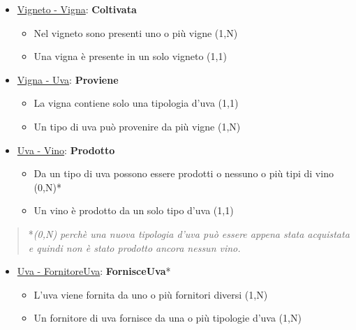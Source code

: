 \begin{itemize}
	\item \underline{Vigneto - Vigna}: \textbf{Coltivata}
	
	\begin{itemize}
		\item Nel vigneto sono presenti uno o più vigne (1,N)
		\item Una vigna è presente in un solo vigneto (1,1)
	\end{itemize}
	
\end{itemize}

\begin{itemize}
	\item \underline{Vigna - Uva}: \textbf{Proviene}
	
	\begin{itemize}
		\item La vigna contiene solo una tipologia d'uva (1,1)
		\item Un tipo di uva può provenire da più vigne (1,N)
	\end{itemize}
	
\end{itemize}

\begin{itemize}
	\item \underline{Uva - Vino}: \textbf{Prodotto}
	
	\begin{itemize}
		\item Da un tipo di uva possono essere prodotti o nessuno o più tipi di vino (0,N)*
		\item Un vino è prodotto da un solo tipo d'uva (1,1)
	\end{itemize}
	
\end{itemize}

\begin{verse}
	*\emph{(0,N) perchè una nuova tipologia d'uva può essere appena stata acquistata e quindi non è stato prodotto ancora nessun vino.}
\end{verse}


\begin{itemize}
	\item \underline{Uva - FornitoreUva}: \textbf{FornisceUva}*
	
	\begin{itemize}
		\item L'uva viene fornita da uno o più fornitori diversi (1,N)
		\item Un fornitore di uva fornisce da una o più tipologie d'uva (1,N)
	\end{itemize}
	
\end{itemize}

